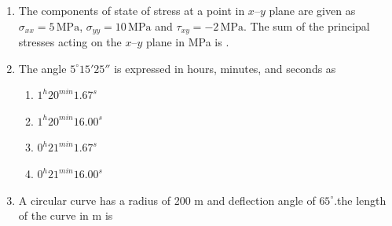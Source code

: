 \documentclass[journal,12pt,onecolumn]{IEEEtran}
\theoremstyle{remark}
\begin{document}
\begin{enumerate}
\hfill{}
\begin{multicols}{2}
\begin{enumerate}
  \item $\sqrt{\dfrac{\sigma_s}{\sigma_i}}$
  \item $\sqrt{\dfrac{\sigma_i}{\sigma_s}}$
  \item $\dfrac{\sigma_i}{\sigma_s}$
  \item $\dfrac{\sigma_s}{\sigma_i}$
\end{enumerate}
\end{multicols}

 \item The components of state of stress at a point in $x$--$y$ plane are given as 
$\sigma_{xx} = 5\,\text{MPa}$, $\sigma_{yy} = 10\,\text{MPa}$ and 
$\tau_{xy} = -2\,\text{MPa}$. The sum of the principal stresses acting on the 
$x$--$y$ plane in MPa is \underline{\hspace{2cm}}.

\hfill{}

\item The angle $5^\circ 15' 25''$ is expressed in hours, minutes, and seconds as

\hfill{}
\begin{multicols}{2}
\begin{enumerate}
\item $1^h 20^{min} 1.67^s$
\item  $1^h 20^{min} 16.00^s$ 
\item $0^h 21^{min} 1.67^s$
\item $0^h 21^{min} 16.00^s$
\end{enumerate}
\end{multicols}

\item A circular curve has a radius of 200 m and deflection angle of $65^\circ$.the length of the curve in m is


\end{enumerate}
\end{document}
